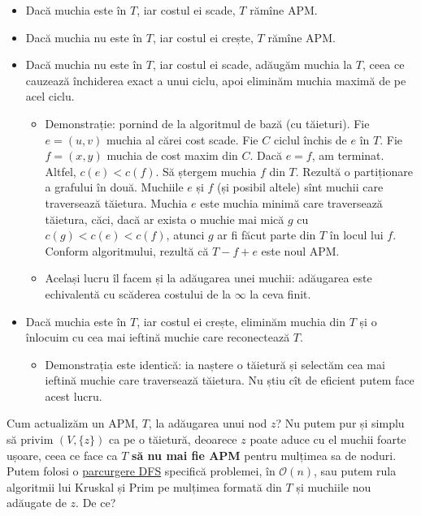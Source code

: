 \documentclass[../main.tex]{subfiles}
\begin{document}
\begin{itemize}
  \item Dacă muchia este în $T$, iar costul ei scade, $T$ rămîne APM.

  \item Dacă muchia nu este în $T$, iar costul ei crește, $T$ rămîne APM.

  \item Dacă muchia nu este în $T$, iar costul ei scade, adăugăm muchia la $T$, ceea ce cauzează închiderea exact a unui ciclu, apoi eliminăm muchia maximă de pe acel ciclu.


  \begin{itemize}
    \item Demonstrație: pornind de la algoritmul de bază (cu tăieturi). Fie $e = (u,v)$ muchia al cărei cost scade. Fie $C$ ciclul închis de $e$ în $T$. Fie $f = (x, y)$ muchia de cost maxim din $C$. Dacă $e = f$, am terminat. Altfel, $c(e) < c(f)$. Să ștergem muchia $f$ din $T$. Rezultă o partiționare a grafului în două. Muchiile $e$ și $f$ (și posibil altele) sînt muchii care traversează tăietura. Muchia $e$ este muchia minimă care traversează tăietura, căci, dacă ar exista o muchie mai mică $g$ cu $c(g) < c(e) < c(f)$, atunci $g$ ar fi făcut parte din $T$ în locul lui $f$. Conform algoritmului, rezultă că $T - f + e$ este noul APM.

    \item Același lucru îl facem și la adăugarea unei muchii: adăugarea este echivalentă cu scăderea costului de la $\infty$ la ceva finit.
  \end{itemize}

  \item Dacă muchia este în $T$, iar costul ei crește, eliminăm muchia din $T$ și o înlocuim cu cea mai ieftină muchie care reconectează $T$.

  \begin{itemize}
    \item Demonstrația este identică: ia naștere o tăietură și selectăm cea mai ieftină muchie care traversează tăietura. Nu știu cît de eficient putem face acest lucru.
  \end{itemize}
\end{itemize}

Cum actualizăm un APM, $T$, la adăugarea unui nod $z$? Nu putem pur și simplu să privim $(V, \{z\})$ ca pe o tăietură, deoarece $z$ poate aduce cu el muchii foarte ușoare, ceea ce face ca $T$ \textbf{să nu mai fie APM} pentru mulțimea sa de noduri. Putem folosi o \href{https://www.sciencedirect.com/science/article/pii/0022000078900223}{parcurgere DFS} specifică problemei, în $\mathcal{O}(n)$, sau putem rula algoritmii lui Kruskal și Prim pe mulțimea formată din $T$ și muchiile nou adăugate de $z$. De ce?
\end{document}
